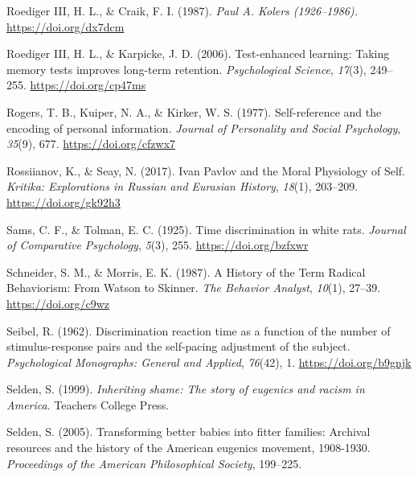 \documentclass[
  oneside,
  12pt]{crumpbook}
\newlength{\cslhangindent}
\newlength{\cslentryspacingunit} %
\newenvironment{CSLReferences}[2] %
 {%
  \setlength{\parindent}{0pt}
  \ifodd #1
  \let\oldpar\par
  \def\par{\hangindent=\cslhangindent\oldpar}
  \fi
  \setlength{\parskip}{#2\cslentryspacingunit}
 }%
 {}
\begin{document}
\begin{CSLReferences}{1}{0}
\leavevmode{}%
Roediger III, H. L., \& Craik, F. I. (1987). \emph{Paul {A}. {Kolers} (1926--1986).} \url{https://doi.org/dx7dcm}

\leavevmode{}%
Roediger III, H. L., \& Karpicke, J. D. (2006). Test-enhanced learning: {Taking} memory tests improves long-term retention. \emph{Psychological Science}, \emph{17}(3), 249--255. \url{https://doi.org/cp47ms}

\leavevmode{}%
Rogers, T. B., Kuiper, N. A., \& Kirker, W. S. (1977). Self-reference and the encoding of personal information. \emph{Journal of Personality and Social Psychology}, \emph{35}(9), 677. \url{https://doi.org/cfzwx7}

\leavevmode{}%
Rossiianov, K., \& Seay, N. (2017). Ivan {Pavlov} and the {Moral Physiology} of {Self}. \emph{Kritika: Explorations in Russian and Eurasian History}, \emph{18}(1), 203--209. \url{https://doi.org/gk92h3}

\leavevmode{}%
Sams, C. F., \& Tolman, E. C. (1925). Time discrimination in white rats. \emph{Journal of Comparative Psychology}, \emph{5}(3), 255. \url{https://doi.org/bzfxwr}

\leavevmode{}%
Schneider, S. M., \& Morris, E. K. (1987). A {History} of the {Term Radical Behaviorism}: {From Watson} to {Skinner}. \emph{The Behavior Analyst}, \emph{10}(1), 27--39. \url{https://doi.org/c9wz}

\leavevmode{}%
Seibel, R. (1962). Discrimination reaction time as a function of the number of stimulus-response pairs and the self-pacing adjustment of the subject. \emph{Psychological Monographs: General and Applied}, \emph{76}(42), 1. \url{https://doi.org/b9gnjk}

\leavevmode{}%
Selden, S. (1999). \emph{Inheriting shame: {The} story of eugenics and racism in {America}}. {Teachers College Press}.

\leavevmode{}%
Selden, S. (2005). Transforming better babies into fitter families: {Archival} resources and the history of the {American} eugenics movement, 1908-1930. \emph{Proceedings of the American Philosophical Society}, 199--225.


\end{CSLReferences}
\end{document}
